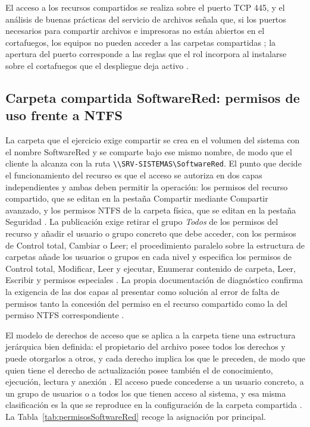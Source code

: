 \documentclass[12pt]{article}
\begin{document}
El acceso a los recursos compartidos se realiza sobre el puerto TCP 445, y el análisis de buenas prácticas del servicio de archivos señala que, si los puertos necesarios para compartir archivos e impresoras no están abiertos en el cortafuegos, los equipos no pueden acceder a las carpetas compartidas \parencite{microsoftSmbPorts}; la apertura del puerto corresponde a las reglas que el rol incorpora al instalarse sobre el cortafuegos que el despliegue deja activo \parencite{microsoftInstallWs2008r2}.

\subsection{Carpeta compartida SoftwareRed: permisos de uso frente a NTFS}
\label{sec:carpetaSoftwareRed}

La carpeta que el ejercicio exige compartir se crea en el volumen del sistema con el nombre SoftwareRed y se comparte bajo ese mismo nombre, de modo que el cliente la alcanza con la ruta \texttt{\textbackslash\textbackslash SRV-SISTEMAS\textbackslash SoftwareRed}. El punto que decide el funcionamiento del recurso es que el acceso se autoriza en dos capas independientes y ambas deben permitir la operación: los permisos del recurso compartido, que se editan en la pestaña Compartir mediante Compartir avanzado, y los permisos NTFS de la carpeta física, que se editan en la pestaña Seguridad \parencite{microsoftShareNtfsPermissions}. La publicación exige retirar el grupo \textit{Todos} de los permisos del recurso y añadir el usuario o grupo concreto que debe acceder, con los permisos de Control total, Cambiar o Leer; el procedimiento paralelo sobre la estructura de carpetas añade los usuarios o grupos en cada nivel y especifica los permisos de Control total, Modificar, Leer y ejecutar, Enumerar contenido de carpeta, Leer, Escribir y permisos especiales \parencite{microsoftShareNtfsPermissions}. La propia documentación de diagnóstico confirma la exigencia de las dos capas al presentar como solución al error de falta de permisos tanto la concesión del permiso en el recurso compartido como la del permiso NTFS correspondiente \parencite{microsoftSharedFolderAccess}.

El modelo de derechos de acceso que se aplica a la carpeta tiene una estructura jerárquica bien definida: el propietario del archivo posee todos los derechos y puede otorgarlos a otros, y cada derecho implica los que le preceden, de modo que quien tiene el derecho de actualización posee también el de conocimiento, ejecución, lectura y anexión \parencite[\S 12.5, p.\ 569]{stallings2018operating}. El acceso puede concederse a un usuario concreto, a un grupo de usuarios o a todos los que tienen acceso al sistema, y esa misma clasificación es la que se reproduce en la configuración de la carpeta compartida \parencite[\S 12.5, p.\ 570]{stallings2018operating}. La Tabla~\ref{tab:permisosSoftwareRed} recoge la asignación por principal.
\end{document}
